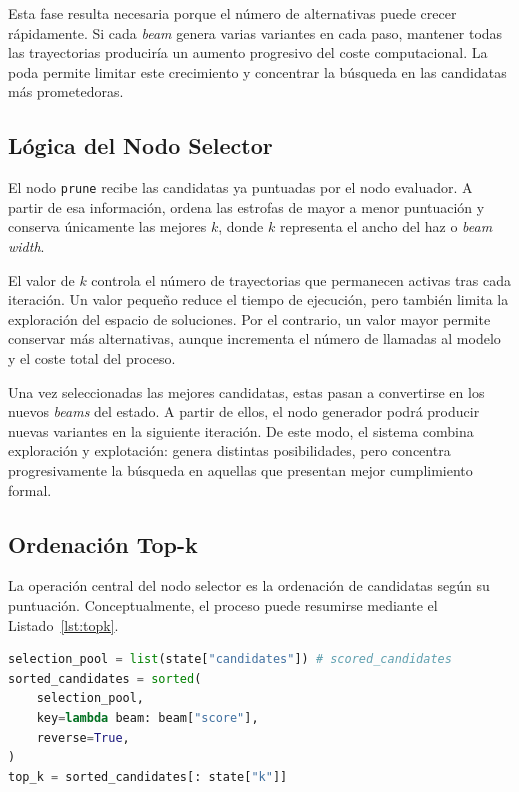 \documentclass[12pt,a4paper,twoside,openright]{book}
\begin{document}
Esta fase resulta necesaria porque el número de alternativas puede crecer rápidamente. Si cada \emph{beam} genera varias variantes en cada paso, mantener todas las trayectorias produciría un aumento progresivo del coste computacional.
La poda permite limitar este crecimiento y concentrar la búsqueda en las candidatas más prometedoras.


\subsection{Lógica del Nodo Selector}

El nodo \texttt{prune} recibe las candidatas ya puntuadas por el nodo evaluador. A partir de esa información, ordena las estrofas de mayor a menor puntuación y conserva únicamente las mejores $k$, donde $k$ representa el ancho del haz o \emph{beam width}.

El valor de $k$ controla el número de trayectorias que permanecen activas tras cada iteración. Un valor pequeño reduce el tiempo de ejecución, pero también limita la exploración del espacio de soluciones.
Por el contrario, un valor mayor permite conservar más alternativas, aunque incrementa el número de llamadas al modelo y el coste total del proceso.

Una vez seleccionadas las mejores candidatas, estas pasan a convertirse en los nuevos \emph{beams} del estado. A partir de ellos, el nodo generador podrá producir nuevas variantes en la siguiente iteración.
De este modo, el sistema combina exploración y explotación: genera distintas posibilidades, pero concentra progresivamente la búsqueda en aquellas que presentan mejor cumplimiento formal.


\subsection{Ordenación Top-k}

La operación central del nodo selector es la ordenación de candidatas según su puntuación. Conceptualmente, el proceso puede resumirse mediante el Listado~\ref{lst:topk}.

\begin{lstlisting}[language=Python, caption={Esquema simplificado de selección top-k}, label={lst:topk}]
selection_pool = list(state["candidates"]) # scored_candidates
sorted_candidates = sorted(
    selection_pool,
    key=lambda beam: beam["score"],
    reverse=True,
)
top_k = sorted_candidates[: state["k"]]
\end{lstlisting}
\end{document}
